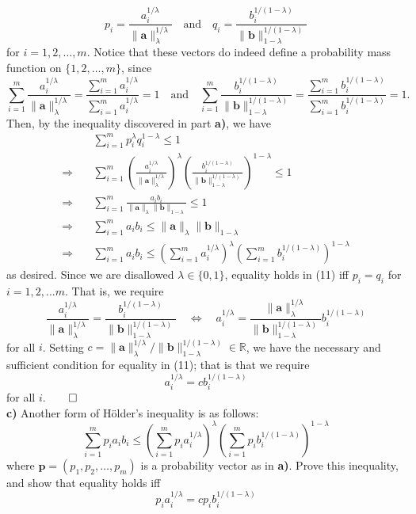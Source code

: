 \documentclass[11pt, letterpaper]{article}
\newcommand{\bs}[1]{\boldsymbol{#1}}
\newcommand{\mbb}[1]{\mathbb{#1}}
\begin{document}
\[p_i=\frac{a_i^{1/\lambda}}{\|\bs{a}\|_\lambda^{1/\lambda}}\quad\text{and}\quad q_i=\frac{b_i^{1/(1-\lambda)}}{\|\bs{b}\|_{1-\lambda}^{1/(1-\lambda)}}\]
for $i=1,2,\dots,m$. Notice that these vectors do indeed define a probability mass function on $\{1,2,\dots,m\}$, since
\[\sum_{i=1}^m\frac{a_i^{1/\lambda}}{\|\bs{a}\|_\lambda^{1/\lambda}}=\frac{\sum_{i=1}^ma_i^{1/\lambda}}{\sum_{i=1}^ma_i^{1/\lambda}}=1\quad\text{and}\quad\sum_{i=1}^m\frac{b_i^{1/(1-\lambda)}}{\|\bs{b}\|_{1-\lambda}^{1/(1-\lambda)}}=\frac{\sum_{i=1}^mb_i^{1/(1-\lambda)}}{\sum_{i=1}^mb_i^{1/(1-\lambda)}}=1.\]
Then, by the inequality discovered in part {\bf a)}, we have
\begin{align*}
    &\sum_{i=1}^mp_i^\lambda q_i^{1-\lambda}\leq 1\\
    \Rightarrow\quad&\sum_{i=1}^m\left(\frac{a_i^{1/\lambda}}{\|\bs{a}\|_\lambda^{1/\lambda}}\right)^\lambda\left(\frac{b_i^{1/(1-\lambda)}}{\|\bs{b}\|_{1-\lambda}^{1/(1-\lambda)}}\right)^{1-\lambda}\leq 1\\
    \Rightarrow\quad&\sum_{i=1}^m\frac{a_ib_i}{\|\bs{a}\|_\lambda\|\bs{b}\|_{1-\lambda}}\leq 1\\
    \Rightarrow\quad&\sum_{i=1}^ma_ib_i\leq\|\bs{a}\|_\lambda\|\bs{b}\|_{1-\lambda}\\
    \Rightarrow\quad&\sum_{i=1}^ma_ib_i\leq\left(\sum_{i=1}^ma_i^{1/\lambda}\right)^{\lambda}\left(\sum_{i=1}^mb_i^{1/(1-\lambda)}\right)^{1-\lambda}\tag{11}
\end{align*}
as desired. Since we are disallowed $\lambda\in\{0,1\}$, equality holds in (11) iff $p_i=q_i$ for $i=1,2,\dots m$. That is, we require
\[\frac{a_i^{1/\lambda}}{\|\bs{a}\|_\lambda^{1/\lambda}}=\frac{b_i^{1/(1-\lambda)}}{\|\bs{b}\|_{1-\lambda}^{1/(1-\lambda)}}\quad\Leftrightarrow\quad a_i^{1/\lambda}=\frac{\|\bs{a}\|_\lambda^{1/\lambda}}{\|\bs{b}\|_{1-\lambda}^{1/(1-\lambda)}}b_i^{1/(1-\lambda)}\]
for all $i$. Setting $c=\|\bs{a}\|_{\lambda}^{1/\lambda}/\|\bs{b}\|_{1-\lambda}^{1/(1-\lambda)}\in\mbb{R}$, we have the necessary and sufficient condition for equality in (11); that is that we require
\[a_i^{1/\lambda}=cb_i^{1/(1-\lambda)}\]
for all $i$.\hfill{$\qed$}\\[10pt]
{\bf c)} Another form of H\"older's inequality is as follows:
\[\sum_{i=1}^mp_ia_ib_i\leq\left(\sum_{i=1}^mp_ia_i^{1/\lambda}\right)^{\lambda}\left(\sum_{i=1}^mp_ib_i^{1/(1-\lambda)}\right)^{1-\lambda}\]
where $\bs{p}=(p_1,p_2,\dots,p_m)$ is a probability vector as in {\bf a)}. Prove this inequality, and show that equality holds iff
\[p_ia_i^{1/\lambda}=cp_ib_i^{1/(1-\lambda)}\]
\end{document}
